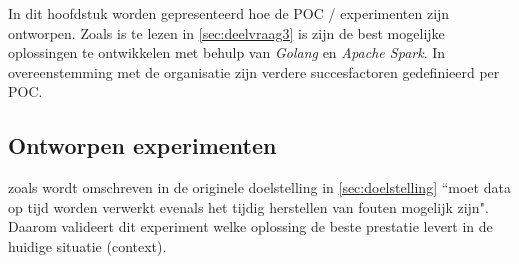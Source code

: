 


In dit hoofdstuk worden gepresenteerd hoe de POC / experimenten zijn ontworpen. Zoals is te lezen in \ref{sec:deelvraag3} is zijn de best mogelijke oplossingen te ontwikkelen met behulp van \textit{Golang} en \textit{Apache Spark}. In overeenstemming met de organisatie zijn verdere succesfactoren gedefinieerd per POC.




\subsection{Ontworpen experimenten}

zoals wordt omschreven in de originele doelstelling in \ref{sec:doelstelling} ``moet data op tijd worden verwerkt evenals het tijdig herstellen van fouten mogelijk zijn".  Daarom valideert dit experiment welke oplossing de beste prestatie levert in de huidige situatie (context).

